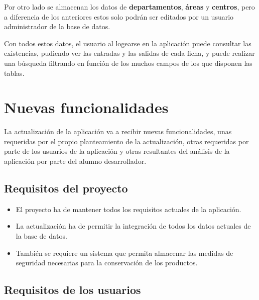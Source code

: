 Por otro lado se almacenan los datos de \textbf{departamentos}, \textbf{áreas} y \textbf{centros}, pero a diferencia de los anteriores estos solo podrán ser editados por un usuario administrador de la base de datos.

Con todos estos datos, el usuario al logearse en la aplicación puede consultar las existencias, pudiendo ver las entradas y las salidas de cada ficha, y puede realizar una búsqueda filtrando en función de los muchos campos de los que disponen las tablas.


\section{Nuevas funcionalidades}

La actualización de la aplicación va a recibir nuevas funcionalidades, unas requeridas por el propio planteamiento de la actualización, otras requeridas por parte de los usuarios de la aplicación y otras resultantes del análisis de la aplicación por parte del alumno desarrollador.

\subsection{Requisitos del proyecto}

\begin{itemize}
\item El proyecto ha de mantener todos los requisitos actuales de la aplicación.

\item La actualización ha de permitir la integración de todos los datos actuales de la base de datos.

\item También se requiere un sistema que permita almacenar las medidas de seguridad necesarias para la conservación de los productos.

\end{itemize}

\subsection{Requisitos de los usuarios}

